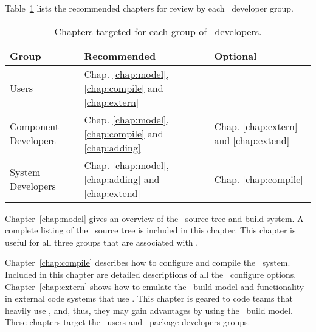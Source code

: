 Table~\ref{tab:layout} lists the recommended chapters for review by each \draco\ developer group.
\begin{table}
  \begin{center}
    \caption{Chapters targeted for each group of \draco\ developers.}
    \label{tab:layout}
    \begin{tabular}{lll}\hline\hline

          Group                             & Recommended  & Optional \\ \hline
	Users                             & Chap. \ref{chap:model}, \ref{chap:compile} and \ref{chap:extern} &    \\
	Component Developers & Chap. \ref{chap:model}, \ref{chap:compile} and \ref{chap:adding} & Chap. \ref{chap:extern} and \ref{chap:extend}  \\
	System Developers        & Chap. \ref{chap:model}, \ref{chap:adding} and \ref{chap:extend}  & Chap. \ref{chap:compile} \\  \hline \hline

    \end{tabular}
  \end{center}
\end{table}
Chapter~\ref{chap:model} gives an overview of the \draco\ source tree
and build system. A complete listing of the \draco\ source tree is
included in this chapter. This chapter is useful for all three groups
that are associated with \draco.

Chapter~\ref{chap:compile} describes how to configure and compile the
\draco\ system.  Included in this chapter are detailed descriptions of
all the \draco\ configure options. Chapter~\ref{chap:extern} shows how
to emulate the \draco\ build model and functionality in external code
systems that use \draco.  This chapter is geared to code teams that
heavily use \draco, and, thus, they may gain advantages by using the
\draco\ build model. These chapters target the \draco\ users and
\draco\ package developers groups.

